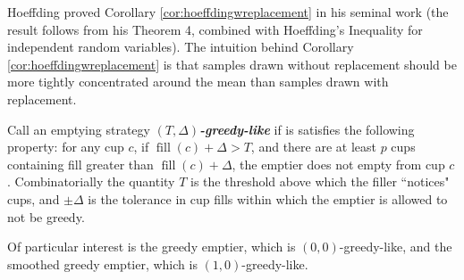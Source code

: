 \documentclass[twocolumn]{article}[10pt]
\newcommand{\defn}[1]{{\textit{\textbf{\boldmath #1}}}\xspace}
\DeclareMathOperator{\fil}{\text{fill}}
\begin{document}
Hoeffding proved Corollary \ref{cor:hoeffdingwreplacement} in his seminal work
\cite{who62} (the result follows from his Theorem 4, combined with Hoeffding's
Inequality for independent random variables).
The intuition behind Corollary \ref{cor:hoeffdingwreplacement} is that samples
drawn without replacement should be more tightly concentrated around the mean
than samples drawn with replacement.

Call an emptying strategy $(T, \Delta)$\defn{-greedy-like} if is satisfies the
following property: for any cup $c$, if $\fil(c) + \Delta > T$, and there are
at least $p$ cups containing fill greater than $\fil(c) + \Delta$, the emptier
does not empty from cup $c$. Combinatorially the quantity $T$ is the threshold
above which the filler ``notices" cups, and $\pm\Delta$ is the tolerance in cup
fills within which the emptier is allowed to not be greedy.

Of particular interest is the greedy emptier, which is $(0,0)$-greedy-like, and
the smoothed greedy emptier, which is $(1, 0)$-greedy-like.
\end{document}
